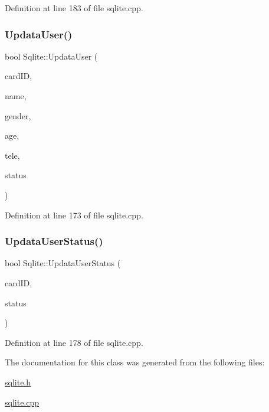 Definition at line 183 of file sqlite.\+cpp.

\mbox{\label{class_sqlite_a7909130f3bbef819bd808c49c9249e2c}} 
\subsubsection{\texorpdfstring{UpdataUser()}{UpdataUser()}}
{\footnotesize\ttfamily bool Sqlite\+::\+Updata\+User (\begin{DoxyParamCaption}\item[{Q\+String}]{card\+ID,  }\item[{Q\+String}]{name,  }\item[{Q\+String}]{gender,  }\item[{int}]{age,  }\item[{Q\+String}]{tele,  }\item[{bool}]{status }\end{DoxyParamCaption})}



Definition at line 173 of file sqlite.\+cpp.

\mbox{\label{class_sqlite_a9827a7be15c19a7ecc943b701baa932b}} 
\subsubsection{\texorpdfstring{UpdataUserStatus()}{UpdataUserStatus()}}
{\footnotesize\ttfamily bool Sqlite\+::\+Updata\+User\+Status (\begin{DoxyParamCaption}\item[{Q\+String}]{card\+ID,  }\item[{bool}]{status }\end{DoxyParamCaption})}



Definition at line 178 of file sqlite.\+cpp.



The documentation for this class was generated from the following files\+:\begin{DoxyCompactItemize}
\item 
\mbox{\hyperlink{sqlite_8h}{sqlite.\+h}}\item 
\mbox{\hyperlink{sqlite_8cpp}{sqlite.\+cpp}}\end{DoxyCompactItemize}
